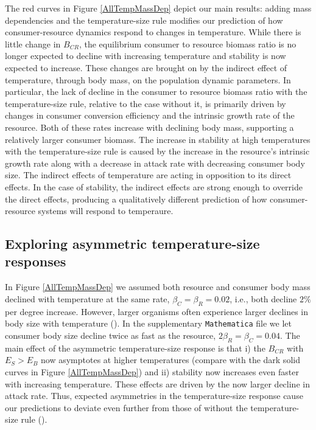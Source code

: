 \documentclass[11pt]{article}
\begin{document}
The red curves in Figure \ref{AllTempMassDep} depict our main results: adding mass dependencies and the temperature-size rule modifies our prediction of how consumer-resource dynamics respond to changes in temperature.
While there is little change in $B_{CR}$, the equilibrium consumer to resource biomass ratio is no longer expected to decline with increasing temperature and stability is now expected to increase.
These changes are brought on by the indirect effect of temperature, through body mass, on the population dynamic parameters.
In particular, the lack of decline in the consumer to resource biomass ratio with the temperature-size rule, relative to the case without it, is primarily driven by changes in consumer conversion efficiency and the intrinsic growth rate of the resource.
Both of these rates increase with declining body mass, supporting a relatively larger consumer biomass. 
The increase in stability at high temperatures with the temperature-size rule is caused by the increase in the resource's intrinsic growth rate along with a decrease in attack rate with decreasing consumer body size. 
The indirect effects of temperature are acting in opposition to its direct effects.
In the case of stability, the indirect effects are strong enough to override the direct effects, producing a qualitatively different prediction of how consumer-resource systems will respond to temperaure.

\subsection*{Exploring asymmetric temperature-size responses}

In Figure \ref{AllTempMassDep} we assumed both resource and consumer body mass declined with temperature at the same rate, $\beta_C = \beta_R = 0.02$, i.e., both decline $2\%$ per degree increase.
However, larger organisms often experience larger declines in body size with temperature (\cite{Forster2012}).
In the supplementary \texttt{Mathematica} file we let consumer body size decline twice as fast as the resource, $2 \beta_R = \beta_C = 0.04$.
The main effect of the asymmetric temperature-size response is that i) the $B_{CR}$ with $E_S > E_B$ now asymptotes at higher temperatures (compare with the dark solid curves in Figure \ref{AllTempMassDep}) and ii) stability now increases even faster with increasing temperature.
These effects are driven by the now larger decline in attack rate.
Thus, expected asymmetries in the temperature-size response cause our predictions to deviate even further from those of without the temperature-size rule (\cite{Gilbert2014}).
\end{document}
